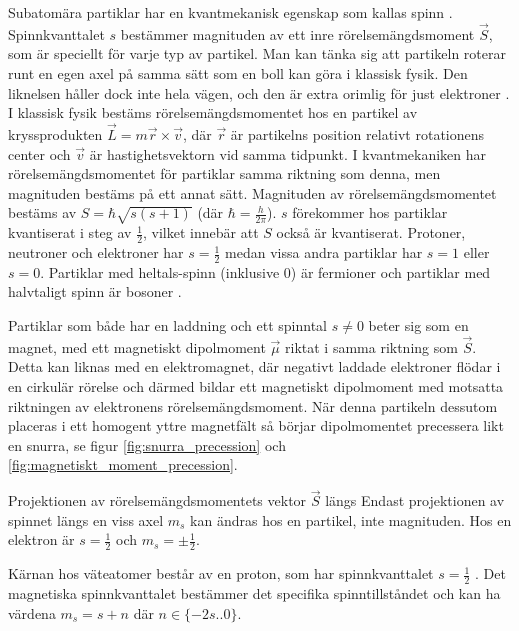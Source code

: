 \documentclass[11pt, a4paper]{article}
\begin{document}
Subatomära partiklar har en kvantmekanisk egenskap som kallas spinn \parencite{kvanttal}. Spinnkvanttalet $s$ bestämmer magnituden av ett inre rörelsemängdsmoment $\vec{S}$, som är speciellt för varje typ av partikel. Man kan tänka sig att partikeln roterar runt en egen axel på samma sätt som en boll kan göra i klassisk fysik. Den liknelsen håller dock inte hela vägen, och den är extra orimlig för just elektroner \parencite{electron_spin}. I klassisk fysik bestäms rörelsemängdsmomentet hos en partikel av kryssprodukten $\vec{L}=m\vec{r}\times\vec{v}$, där $\vec{r}$ är partikelns position relativt rotationens center och $\vec{v}$ är hastighetsvektorn vid samma tidpunkt. I kvantmekaniken har rörelsemängdsmomentet för partiklar samma riktning som denna, men magnituden bestäms på ett annat sätt. Magnituden av rörelsemängds\-momentet bestäms av $S=\hbar\sqrt{s(s+1)}$ (där $\hbar=\frac{h}{2\pi}$). $s$ förekommer hos partiklar kvantiserat i steg av $\frac{1}{2}$, vilket innebär att $S$ också är kvantiserat. Protoner, neutroner och elektroner har $s=\frac{1}{2}$ medan vissa andra partiklar har $s=1$ eller $s=0$. Partiklar med heltals-spinn (inklusive 0) är fermioner och partiklar med halvtaligt spinn är bosoner \parencite{subatomic_particles}.

Partiklar som både har en laddning och ett spinntal $s\neq 0$ beter sig som en magnet, med ett magnetiskt dipolmoment $\vec{\mu}$ riktat i samma riktning som $\vec{S}$. Detta kan liknas med en elektromagnet, där negativt laddade elektroner flödar i en cirkulär rörelse och därmed bildar ett magnetiskt dipolmoment med motsatta riktningen av elektronens rörelsemängdsmoment. När denna partikeln dessutom placeras i ett homogent yttre magnetfält så börjar dipolmomentet precessera likt en snurra, se figur \ref{fig:snurra_precession} och \ref{fig:magnetiskt_moment_precession}.

Projektionen av rörelsemängdsmomentets vektor $\vec{S}$ längs  Endast projektionen av spinnet längs en viss axel $m_s$ kan ändras hos en partikel, inte magnituden. Hos en elektron är $s=\frac{1}{2}$ och $m_s=\pm\frac{1}{2}$.

Kärnan hos väteatomer består av en proton, som har spinnkvanttalet $s=\frac{1}{2}$ . Det magnetiska spinnkvanttalet bestämmer det specifika spinntillståndet och kan ha värdena $m_s=s+n$ där $n\in\{-2s..0\}$. 
\end{document}
